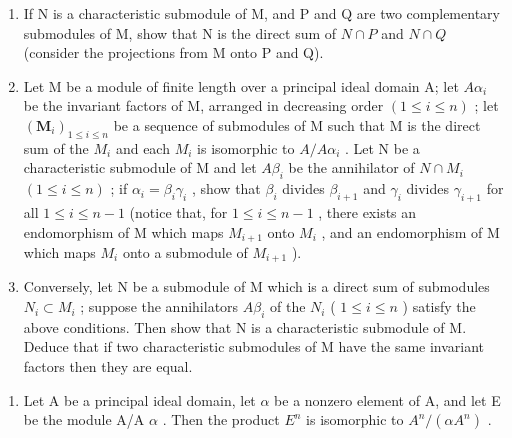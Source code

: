 \begin{enumerate}
\def\labelenumi{\alph{enumi})}
\item
  If N is a characteristic submodule of M, and P and Q are two complementary submodules of M, show that N is the direct sum of \(N \cap P\) and \(N \cap Q\) (consider the projections from M onto P and Q).
\item
  Let M be a module of finite length over a principal ideal domain A; let \(A\alpha_{i}\) be the invariant factors of M, arranged in decreasing order \((1 \leqslant i \leqslant n)\) ; let \((\mathbf{M}_{i})_{1 \leqslant i \leqslant n}\) be a sequence of submodules of M such that M is the direct sum of the \(M_{i}\) and each \(M_{i}\) is isomorphic to \(A/A\alpha_{i}\) . Let N be a characteristic submodule of M and let \(A\beta_{i}\) be the annihilator of \(N \cap M_{i}\) \((1 \leqslant i \leqslant n)\) ; if \(\alpha_{i} = \beta_{i}\gamma_{i}\) , show that \(\beta_{i}\) divides \(\beta_{i+1}\) and \(\gamma_{i}\) divides \(\gamma_{i+1}\) for all \(1 \leqslant i \leqslant n-1\) (notice that, for \(1 \leqslant i \leqslant n-1\) , there exists an endomorphism of M which maps \(M_{i+1}\) onto \(M_{i}\) , and an endomorphism of M which maps \(M_{i}\) onto a submodule of \(M_{i+1}\) ).
\item
  Conversely, let N be a submodule of M which is a direct sum of submodules \(N_{i} \subset M_{i}\) ; suppose the annihilators \(A\beta_{i}\) of the \(N_{i}\) ( \(1 \leqslant i \leqslant n\) ) satisfy the above conditions. Then show that N is a characteristic submodule of M. Deduce that if two characteristic submodules of M have the same invariant factors then they are equal.
\end{enumerate}

\begin{enumerate}
\def\labelenumi{\arabic{enumi})}
\setcounter{enumi}{16}
\tightlist
\item
  Let A be a principal ideal domain, let \(\alpha\) be a nonzero element of A, and let E be the module A/A \(\alpha\) . Then the product \(E^{n}\) is isomorphic to \(A^{n}/(\alpha A^{n})\) .
\end{enumerate}

